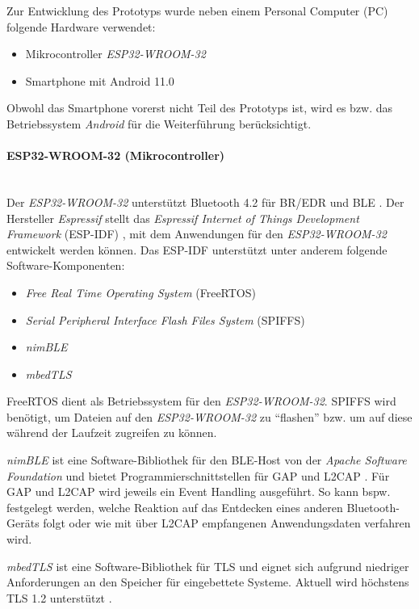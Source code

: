 Zur Entwicklung des Prototyps wurde neben einem Personal Computer (PC) folgende Hardware verwendet:

\begin{itemize}
    \item Mikrocontroller \textit{ESP32-WROOM-32}
    \item Smartphone mit Android 11.0
\end{itemize}

Obwohl das Smartphone vorerst nicht Teil des Prototyps ist, wird es bzw. das Betriebssystem \textit{Android} für die Weiterführung berücksichtigt.

\paragraph{ESP32-WROOM-32 (Mikrocontroller)} \mbox{} \vspace{0.2cm} \\
Der \textit{ESP32-WROOM-32} unterstützt Bluetooth 4.2 für BR/EDR und BLE \cite{ESP32_6}. Der Hersteller \textit{Espressif} stellt das \textit{Espressif Internet of Things Development Framework} (ESP-IDF) \cite{ESPIDF}, mit dem Anwendungen für den \textit{ESP32-WROOM-32} entwickelt werden können. Das ESP-IDF unterstützt unter anderem folgende Software-Komponenten:

\begin{itemize}
    \item \textit{Free Real Time Operating System} (FreeRTOS)
    \item \textit{Serial Peripheral Interface Flash Files System} (SPIFFS)
    \item \textit{nimBLE}
    \item \textit{mbedTLS}
\end{itemize}

FreeRTOS dient als Betriebssystem für den \textit{ESP32-WROOM-32}. SPIFFS wird benötigt, um Dateien auf den \textit{ESP32-WROOM-32} zu "`flashen"' bzw. um auf diese während der Laufzeit zugreifen zu können.

\textit{nimBLE} ist eine Software-Bibliothek für den BLE-Host von der \textit{Apache Software Foundation} und bietet Programmierschnittstellen für GAP und L2CAP \cite{nimBLE}. Für GAP und L2CAP wird jeweils ein Event Handling ausgeführt. So kann bspw. festgelegt werden, welche Reaktion auf das Entdecken eines anderen Bluetooth-Geräts folgt oder wie mit über L2CAP empfangenen Anwendungsdaten verfahren wird.

\textit{mbedTLS} ist eine Software-Bibliothek für TLS und eignet sich aufgrund niedriger Anforderungen an den Speicher für eingebettete Systeme. Aktuell wird höchstens TLS 1.2 unterstützt \cite{ArmMbedCoreFeatures}.

